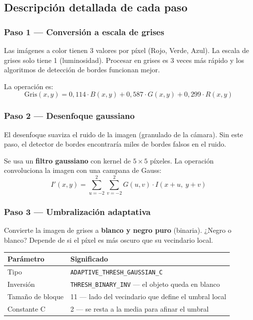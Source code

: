 \documentclass[12pt, a4paper]{article}
\begin{document}
\subsection{Descripción detallada de cada paso}

\subsubsection{Paso 1 — Conversión a escala de grises}

\begin{notebox}[title={¿Por qué escala de grises?}]
Las imágenes a color tienen 3 valores por píxel (Rojo, Verde, Azul).
La escala de grises solo tiene 1 (luminosidad). Procesar en grises es
3 veces más rápido y los algoritmos de detección de bordes funcionan mejor.
\end{notebox}

La operación es:
$$\text{Gris}(x,y) = 0{,}114 \cdot B(x,y) + 0{,}587 \cdot G(x,y) + 0{,}299 \cdot R(x,y)$$

\subsubsection{Paso 2 — Desenfoque gaussiano}

El desenfoque suaviza el ruido de la imagen (granulado de la cámara).
Sin este paso, el detector de bordes encontraría miles de bordes falsos
en el ruido.

Se usa un \textbf{filtro gaussiano} con kernel de $5 \times 5$ píxeles.
La operación convoluciona la imagen con una campana de Gauss:
$$I'(x,y) = \sum_{u=-2}^{2}\sum_{v=-2}^{2} G(u,v) \cdot I(x+u,\ y+v)$$

\subsubsection{Paso 3 — Umbralización adaptativa}

Convierte la imagen de grises a \textbf{blanco y negro puro} (binaria).
¿Negro o blanco? Depende de si el píxel es más oscuro que su vecindario local.

\begin{center}
\begin{tabular}{lp{7cm}}
\toprule
\textbf{Parámetro} & \textbf{Significado} \\
\midrule
Tipo & \texttt{ADAPTIVE\_THRESH\_GAUSSIAN\_C} \\
Inversión & \texttt{THRESH\_BINARY\_INV} — el objeto queda en blanco \\
Tamaño de bloque & 11 — lado del vecindario que define el umbral local \\
Constante C & 2 — se resta a la media para afinar el umbral \\
\bottomrule
\end{tabular}
\end{center}
\end{document}
